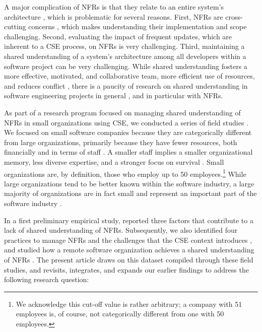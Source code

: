 \documentclass[smallextended]{svjour3}        %
\begin{document}
A major complication of NFRs is that they relate to an entire system's architecture \citep{bass2012software}, which is problematic for several reasons. First, NFRs are cross-cutting concerns \citep{bellomo_evolutionary_2014}, which makes understanding their implementation and scope challenging. Second, evaluating the impact of frequent updates, which are inherent to a CSE process, on NFRs is very challenging. 
Third, maintaining a shared understanding of a system's architecture among all developers within a software project can be very challenging. 
While shared understanding fosters a more effective, motivated, and collaborative team, more efficient use of resources, and reduces conflict \citep{darch_shared_2009}, there is a paucity of research on shared understanding in software engineering projects in general \citep{glinz_shared_2015}, and in particular with NFRs. 


As part of a research program focused on managing shared understanding of NFRs in small organizations using CSE, we conducted a series of field studies \citep{werner2020re,werner_tse_2021,okpara_re2022,okpara_rej2023}. 
We focused on small software companies because they are categorically different from large organizations, primarily because they have fewer resources, both financially and in terms of staff \citep{richardson2007guest}. 
A smaller staff implies a smaller organizational memory, less diverse expertise, and a stronger focus on survival \citep{sanchez2016understanding}.
Small organizations are, by definition, those who employ up to 50 employees.\footnote{We acknowledge this cut-off value is rather arbitrary; a company with 51 employees is, of course, not categorically different from one with 50 employees.} While large organizations tend to be better known within the software industry, a large majority of organizations are in fact small and represent an important part of the software industry \citep{richardson2007guest,sanchez2016understanding}. 

In a first preliminary empirical study, \cite{werner2020re} reported three factors that contribute to a lack of shared understanding of NFRs. 
Subsequently, we also identified four practices to manage NFRs and the challenges that the CSE context introduces \citep{werner_tse_2021}, and studied how a remote software organization achieves a shared understanding of NFRs \citep{okpara_re2022,okpara_rej2023}. 
The present article draws on this dataset compiled through these field studies, and revisits, integrates, and expands our earlier findings to address the following research question:
\end{document}
